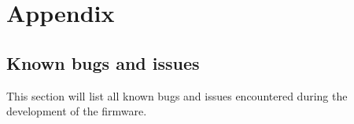 \chapter{Appendix}

\section{Known bugs and issues}

This section will list all known bugs and issues encountered during the development of the firmware.
